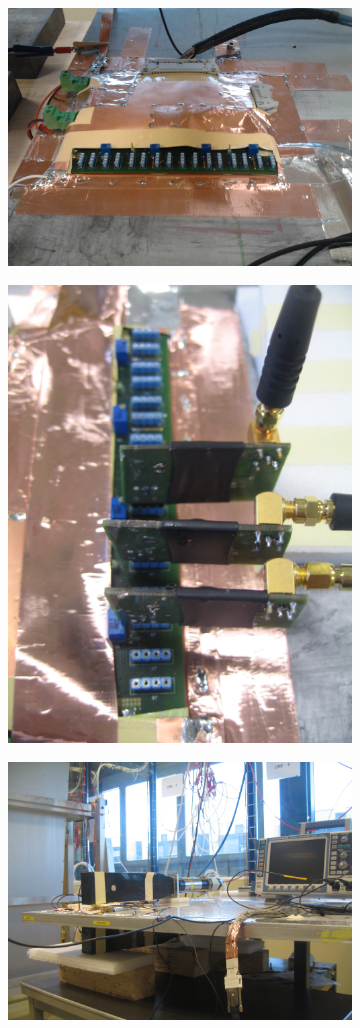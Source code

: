 	\begin{figure}[H]
		\begin{subfigure}{.5\linewidth}
		    \centering
			\includegraphics[width = \linewidth]{fig/chapt6/ATLAS_FEB.png}
			\caption{\label{fig:Setup-INFN-904:A}}
		\end{subfigure}
		\begin{subfigure}{.5\linewidth}
		    \centering
			\includegraphics[width = 0.56\linewidth]{fig/chapt6/ATLAS_preamp.JPG}
			\caption{\label{fig:Setup-INFN-904:B}}
		\end{subfigure}
		\begin{subfigure}{\linewidth}
		    \centering
			\includegraphics[width = 0.5\linewidth]{fig/chapt6/Setup_ATLAS_PAK.JPG}

\end{subfigure}
\end{figure}
